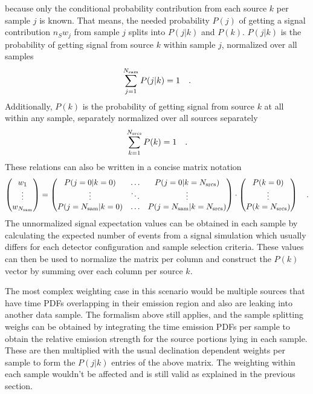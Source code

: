 because only the conditional probability contribution from each source $k$ per sample $j$ is known.
That means, the needed probability $P(j)$ of getting a signal contribution $n_S w_j$ from sample $j$ splits into $P(j|k)$ and $P(k)$.
$P(j|k)$ is the probability of getting signal from source $k$ within sample $j$, normalized over all samples
\begin{equation}
  \sum_{j=1}^{N_\text{sam}} P(j|k) = 1
  \quad\text{.}
\end{equation}
Additionally, $P(k)$ is the probability of getting signal from source $k$ at all within any sample, separately normalized over all sources separately
\begin{equation}
  \sum_{k=1}^{N_\text{srcs}} P(k) = 1
  \quad\text{.}
\end{equation}
These relations can also be written in a concise matrix notation
\begin{equation}
  \begin{pmatrix} w_1 \\ \vdots \\ w_{N_\text{sam}} \end{pmatrix} =
    \begin{pmatrix}
      P(j=0|k=0) & \dots & P(j=0|k=N_\text{srcs}) \\
      \vdots & \ddots & \vdots \\
      P(j=N_\text{sam}|k=0) & \dots & P(j=N_\text{sam}|k=N_\text{srcs})
    \end{pmatrix} \cdot
    \begin{pmatrix}
      P(k=0) \\ \vdots \\ P(k=N_\text{srcs})
    \end{pmatrix}
  \quad\text{.}
\end{equation}
The unnormalized signal expectation values can be obtained in each sample by calculating the expected number of events from a signal simulation which usually differs for each detector configuration and sample selection criteria.
These values can then be used to normalize the matrix per column and construct the $P(k)$ vector by summing over each column per source $k$.

The most complex weighting case in this scenario would be multiple sources that have time PDFs overlapping in their emission region and also are leaking into another data sample.
The formalism above still applies, and the sample splitting weighs can be obtained by integrating the time emission PDFs per sample to obtain the relative emission strength for the source portions lying in each sample.
These are then multiplied with the usual declination dependent weights per sample to form the $P(j|k)$ entries of the above matrix.
The weighting within each sample wouldn't be affected and is still valid as explained in the previous section.

